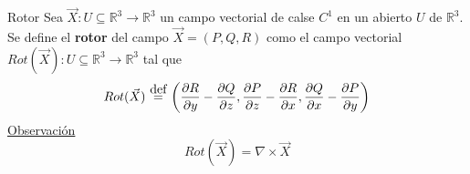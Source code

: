 \documentclass{report}
\newcommand\defeq{\stackrel{\mathclap{\normalfont\mbox{def}}}{~=~}}
\newcommand\reals{\mathds{R}}
\begin{document}
\begin{defbox}{Rotor}
	Sea $\vec{X} : U \subseteq \reals^3 \rightarrow \reals^3$ un campo vectorial de calse $C^1$ en un abierto $U$ de $\reals^3$. \\
	Se define el \textbf{rotor} del campo $\vec{X} = (P,Q,R)$ como el campo vectorial $Rot(\vec{X}) : U \subseteq \reals^3 \rightarrow \reals^3$ tal que
	\begin{equation}
		Rot(\vec{X}) \defeq \left(
		\frac{\partial{R}}{\partial{y}}-\frac{\partial{Q}}{\partial{z}},
		\frac{\partial{P}}{\partial{z}}-\frac{\partial{R}}{\partial{x}},
		\frac{\partial{Q}}{\partial{x}}-\frac{\partial{P}}{\partial{y}}
		\right)
		\label{eq:rotor}
	\end{equation}
	\underline{Observación} \\
	\[
		Rot(\vec{X}) = \nabla \times \vec{X}
	\]
\end{defbox}
\end{document}
